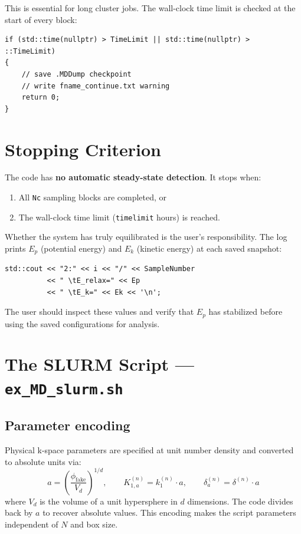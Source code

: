 \documentclass[12pt,a4paper]{article}
\begin{document}
This is essential for long cluster jobs. The wall-clock time limit is checked
at the start of every block:
\begin{lstlisting}
if (std::time(nullptr) > TimeLimit || std::time(nullptr) > ::TimeLimit)
{
    // save .MDDump checkpoint
    // write fname_continue.txt warning
    return 0;
}
\end{lstlisting}

\section{Stopping Criterion}

The code has \textbf{no automatic steady-state detection}. It stops when:
\begin{enumerate}
    \item All \texttt{Nc} sampling blocks are completed, or
    \item The wall-clock time limit (\texttt{timelimit} hours) is reached.
\end{enumerate}

Whether the system has truly equilibrated is the user's responsibility.
The log prints $E_p$ (potential energy) and $E_k$ (kinetic energy) at
each saved snapshot:
\begin{lstlisting}
std::cout << "2:" << i << "/" << SampleNumber
          << " \tE_relax=" << Ep
          << " \tE_k=" << Ek << '\n';
\end{lstlisting}

The user should inspect these values and verify that $E_p$ has stabilized
before using the saved configurations for analysis.

\section{The SLURM Script --- \texttt{ex\_MD\_slurm.sh}}

\subsection{Parameter encoding}

Physical k-space parameters are specified at unit number density and
converted to absolute units via:
\begin{equation}
    a = \left(\frac{\phi_\text{fake}}{V_d}\right)^{1/d}, \qquad
    K_{1,a}^{(n)} = k_1^{(n)} \cdot a, \qquad
    \delta_a^{(n)} = \delta^{(n)} \cdot a
\end{equation}
where $V_d$ is the volume of a unit hypersphere in $d$ dimensions.
The code divides back by $a$ to recover absolute values.
This encoding makes the script parameters independent of $N$ and box size.
\end{document}

